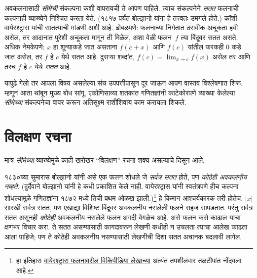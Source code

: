 अवकलनासाठी \emph{सीमेची} संकल्पना कशी वापरायची ते आपण पाहिले. त्याच संकल्पनेने \emph{सतत} फलनाची कल्पनाही व्याख्येने निश्चित करता येते. (१८१७ पर्यंत बोल्झानो यांना हे तत्त्वतः उमगले होते.) कॉशी–वायेरश्ट्रास यांची सातत्याची मांडणी अशी आहे. ढोबळपणे: फलनाच्या निर्गतात ठरावीक अचूकता हवी असेल, तर आदानात पुरेशी अचूकता मागून ती मिळेल, अशा वेळी फलन~$f$ त्या बिंदूवर सतत असते. अधिक नेमकेपणे: $x$ हा शून्याकडे जात असताना $f(c + x)$ आणि $f(c)$ यांतील फरकही $0$ कडे जात असेल, तर $f$ हे $c$ येथे सतत आहे. दुसऱ्या शब्दांत, $f(c) = \lim_{x \rightarrow c} f(x)$ असेल तर आणि तरच $f$ हे $c$ येथे \emph{सतत} आहे.

यापुढे गेलो तर आपला विषय असलेल्या संच उपपत्तीपासून दूर जाऊन आपण वास्तव विश्लेषणात शिरू. म्हणून आता थांबून मुख्य बोध सांगू. एकोणिसाव्या शतकात गणितज्ञांनी काटेकोरपणे व्याख्या केलेल्या \emph{सीमेच्या} संकल्पनेचा वापर करून अतिसूक्ष्म राशींशिवाय काम करायला शिकले.







\section{विलक्षण रचना}\label{his:set:pathology:sec}

मात्र \emph{सीमेच्या} व्याख्येमुळे काही खरोखर “विलक्षण” रचना शक्य असल्याचे दिसून आले.

१८३०च्या सुमारास बोल्झानो यांनी असे एक फलन शोधले जे \emph{सर्वत्र सतत} होते, पण \emph{कोठेही अवकलनीय नव्हते}. (दुर्दैवाने बोल्झानो यांनी हे कधी प्रकाशित केले नाही. वायेरश्ट्रास यांनी स्वतंत्रपणे हीच कल्पना शोधल्यामुळे गणितज्ञांना १८७२ मध्ये तिची प्रथम ओळख झाली.)\footnote{हा इतिहास \href{http://en.wikipedia.org/wiki/Weierstrass_function}{वायेरश्ट्रास फलनावरील विकिपीडिया लेखाच्या} अत्यंत तपशीलवार तळटीपांत नोंदवला आहे.} हे किमान आश्चर्यकारक तरी होतेच. $|x|$ सारखी सर्वत्र सतत, पण एखाद्या विशिष्ट बिंदूवर अवकलनीय नसलेली फलने सहज सापडतात. परंतु सर्वत्र सतत असूनही \emph{कोठेही} अवकलनीय नसलेले फलन अगदी वेगळेच आहे. असे फलन कसे काढाल याचा क्षणभर विचार करा. ते सतत असण्यासाठी कागदावरून लेखणी कधीही न उचलता त्याचा आलेख काढता आला पाहिजे; पण ते कोठेही अवकलनीय नसण्यासाठी लेखणीची दिशा सतत अचानक बदलावी लागेल.

